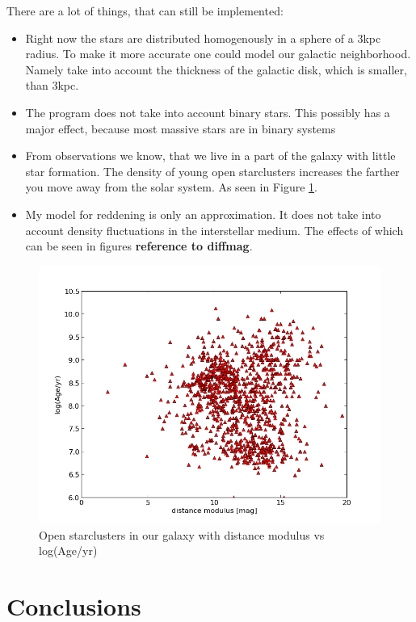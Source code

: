\documentclass[a4paper,10pt]{article}
\begin{document}
 There are a lot of things, that can still be implemented:\\
 \begin{itemize}
  \item Right now the stars are distributed homogenously in a sphere of a 3kpc radius. To make it more accurate one could model our
  galactic neighborhood. Namely take into account the thickness of the galactic disk, which is smaller, than 3kpc.
  \item The program does not take into account binary stars. This possibly has a major effect, because most massive stars are in binary
  systems \citep{2012Sci...337..444S}
  \item From observations we know, that we live in a part of the galaxy with little star formation.  
  The density of young open starclusters increases the farther you move away from the solar system. As seen in Figure \ref{clusters}.
  \item My model for reddening is only an approximation. It does not take into account density fluctuations in the interstellar medium. 
  The effects of which can be seen in figures \textbf{reference to diffmag}.
 \end{itemize}
 \begin{figure}[h!]
  \includegraphics[width=\textwidth]{clusters}
  \caption{Open starclusters in our galaxy with distance modulus vs log(Age/yr)  \label{clusters}}
 \end{figure}

 
 \section{Conclusions}
 
 
 
 
\end{document}
